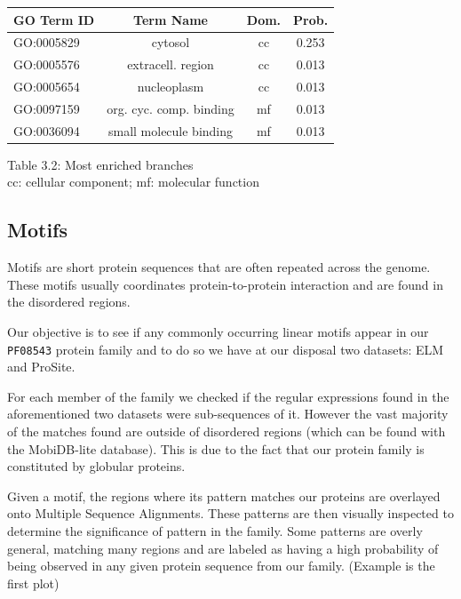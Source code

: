 \documentclass[10pt,twocolumn,letterpaper]{article}
\begin{document}
\begin{center}
    \begin{tabular}{lccc}
        \toprule
        GO Term ID & Term Name & Dom. & Prob. \\
        \midrule
        GO:0005829	& \small{cytosol} & cc & 0.253 \\
        GO:0005576	& \small{extracell. region} & cc & 0.013 \\
        GO:0005654	& \small{nucleoplasm} &	cc & 0.013 \\
        GO:0097159	& \small{org. cyc. comp. binding} & mf	& 0.013 \\
        GO:0036094	& \small{small molecule binding} & mf & 0.013 \\
        \bottomrule
    \end{tabular}
\end{center} 
\begin{center}
    \small{Table 3.2: Most enriched branches}\\
    \small{cc: cellular component; mf: molecular function}\\
    
\end{center}



\subsection{Motifs}
Motifs are short protein sequences that are often repeated across the genome. These motifs usually coordinates protein-to-protein interaction and are found in the disordered regions. 

Our objective is to see if any commonly occurring linear motifs appear in our \texttt{PF08543} protein family and to do so we have at our disposal two datasets: ELM and ProSite.

For each member of the family we checked if the regular expressions found in the aforementioned two datasets were sub-sequences of it. However the vast majority of the matches found are outside of disordered regions (which can be found with the MobiDB-lite database). This is due to the fact that our protein family is constituted by globular proteins.

Given a motif, the regions where its pattern matches our proteins are overlayed onto Multiple Sequence Alignments. These patterns are then visually inspected to determine the significance of pattern in the family.
Some patterns are overly general, matching many regions and are labeled as having a high probability of being observed in any given protein sequence from our family. (Example is the first plot)
\end{document}
